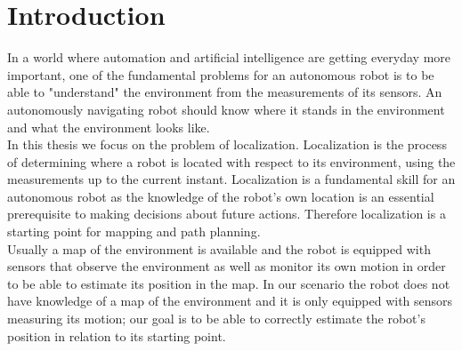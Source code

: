 \chapter{Introduction}\label{intro_localization}

In a world where automation and artificial intelligence are getting everyday more important, one of the fundamental problems for an autonomous robot is to be able to "understand" the environment from the measurements of its sensors. An autonomously navigating robot should know where it stands in the environment and what the environment looks like.\\

In this thesis we focus on the problem of localization. Localization\supercite{localization} is the process of determining where a robot is located with respect to its environment, using the measurements up to the current instant. Localization is a fundamental skill for an autonomous robot as the knowledge of the robot's own location is an essential prerequisite to making decisions about future actions. Therefore localization is a starting point for mapping and path planning.\\
Usually a map of the environment is available and the robot is equipped with sensors that observe the environment as well as monitor its own motion in order to be able to estimate its position in the map. In our scenario the robot does not have knowledge of a map of the environment and it is only equipped with sensors measuring its motion; our goal is to be able to correctly estimate the robot's position in relation to its starting point.

